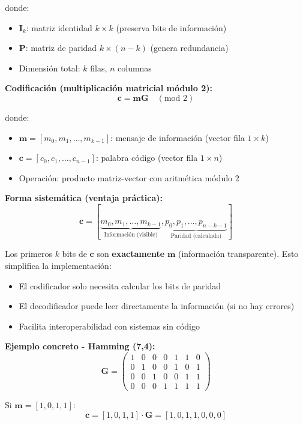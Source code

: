 \documentclass[10pt,a4paper]{article}
\begin{document}
donde:
\begin{itemize}
\item $\mathbf{I}_k$: matriz identidad $k \times k$ (preserva bits de información)
\item $\mathbf{P}$: matriz de paridad $k \times (n-k)$ (genera redundancia)
\item Dimensión total: $k$ filas, $n$ columnas
\end{itemize}

\textbf{Codificación (multiplicación matricial módulo 2):}
$$\boxed{\mathbf{c} = \mathbf{m}\mathbf{G} \quad (\text{mod } 2)}$$

donde:
\begin{itemize}
\item $\mathbf{m} = [m_0, m_1, \ldots, m_{k-1}]$: mensaje de información (vector fila $1 \times k$)
\item $\mathbf{c} = [c_0, c_1, \ldots, c_{n-1}]$: palabra código (vector fila $1 \times n$)
\item Operación: producto matriz-vector con aritmética módulo 2
\end{itemize}

\textbf{Forma sistemática (ventaja práctica):}
$$\mathbf{c} = [\underbrace{m_0, m_1, \ldots, m_{k-1}}_{\text{Información (visible)}}, \underbrace{p_0, p_1, \ldots, p_{n-k-1}}_{\text{Paridad (calculada)}}]$$

Los primeros $k$ bits de $\mathbf{c}$ son \textbf{exactamente} $\mathbf{m}$ (información transparente). Esto simplifica la implementación:
\begin{itemize}
\item El codificador solo necesita calcular los bits de paridad
\item El decodificador puede leer directamente la información (si no hay errores)
\item Facilita interoperabilidad con sistemas sin código
\end{itemize}

\textbf{Ejemplo concreto - Hamming (7,4):}
$$\mathbf{G} = \begin{pmatrix}
1 & 0 & 0 & 0 & 1 & 1 & 0\\
0 & 1 & 0 & 0 & 1 & 0 & 1\\
0 & 0 & 1 & 0 & 0 & 1 & 1\\
0 & 0 & 0 & 1 & 1 & 1 & 1
\end{pmatrix}$$

Si $\mathbf{m} = [1, 0, 1, 1]$:
$$\mathbf{c} = [1, 0, 1, 1] \cdot \mathbf{G} = [1, 0, 1, 1, 0, 0, 0]$$
\end{document}
